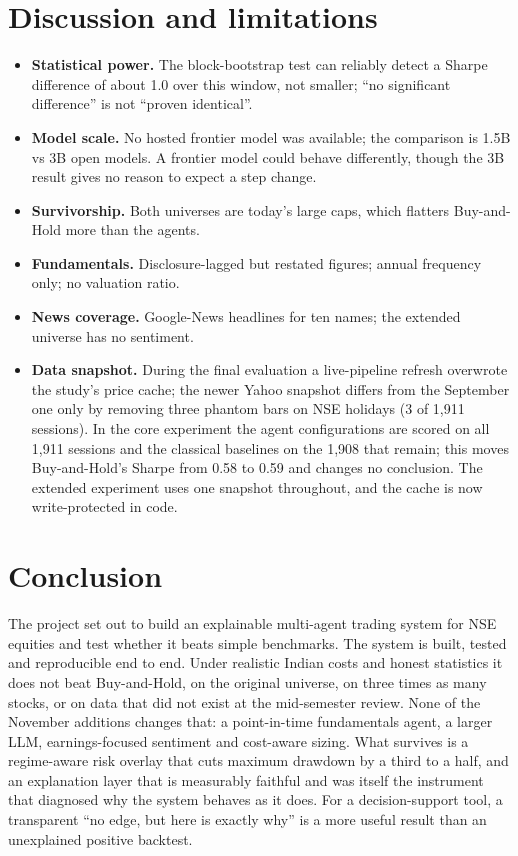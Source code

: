 \documentclass[11pt,a4paper]{article}
\begin{document}
\section{Discussion and limitations}
\begin{itemize}
\item \textbf{Statistical power.} The block-bootstrap test can reliably detect a Sharpe difference of about 1.0 over this window, not smaller; ``no significant difference'' is not ``proven identical''.
\item \textbf{Model scale.} No hosted frontier model was available; the comparison is 1.5B vs 3B open models. A frontier model could behave differently, though the 3B result gives no reason to expect a step change.
\item \textbf{Survivorship.} Both universes are today's large caps, which flatters Buy-and-Hold more than the agents.
\item \textbf{Fundamentals.} Disclosure-lagged but restated figures; annual frequency only; no valuation ratio.
\item \textbf{News coverage.} Google-News headlines for ten names; the extended universe has no sentiment.
\item \textbf{Data snapshot.} During the final evaluation a live-pipeline refresh overwrote the study's price cache; the newer Yahoo snapshot differs from the September one only by removing three phantom bars on NSE holidays (3 of 1,911 sessions). In the core experiment the agent configurations are scored on all 1,911 sessions and the classical baselines on the 1,908 that remain; this moves Buy-and-Hold's Sharpe from 0.58 to 0.59 and changes no conclusion. The extended experiment uses one snapshot throughout, and the cache is now write-protected in code.
\end{itemize}
\section{Conclusion}
The project set out to build an explainable multi-agent trading system for NSE equities and test whether it beats simple benchmarks. The system is built, tested and reproducible end to end. Under realistic Indian costs and honest statistics it does not beat Buy-and-Hold, on the original universe, on three times as many stocks, or on data that did not exist at the mid-semester review. None of the November additions changes that: a point-in-time fundamentals agent, a larger LLM, earnings-focused sentiment and cost-aware sizing. What survives is a regime-aware risk overlay that cuts maximum drawdown by a third to a half, and an explanation layer that is measurably faithful and was itself the instrument that diagnosed why the system behaves as it does. For a decision-support tool, a transparent ``no edge, but here is exactly why'' is a more useful result than an unexplained positive backtest.
\end{document}
